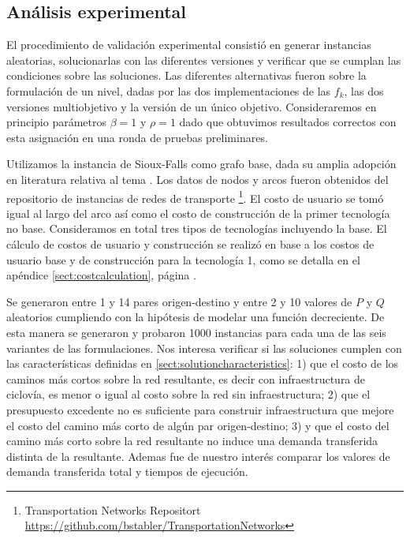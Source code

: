 \documentclass{article}
\begin{document}
  \FloatBarrier
  \subsection{Análisis experimental}

  El procedimiento de validación experimental consistió en generar instancias aleatorias, solucionarlas con las diferentes versiones y verificar que se cumplan las condiciones sobre las soluciones. Las diferentes alternativas fueron sobre la formulación de un nivel, dadas por las dos implementaciones de las $f_k$, las dos versiones multiobjetivo y la versión de un único objetivo. Consideraremos en principio parámetros $\beta = 1$ y $\rho = 1$ dado que obtuvimos resultados correctos con esta asignación en una ronda de pruebas preliminares.

  Utilizamos la instancia de Sioux-Falls como grafo base, dada su amplia adopción en literatura relativa al tema \cite{liu2019}. Los datos de nodos y arcos fueron obtenidos del repositorio de instancias de redes de transporte \footnote{Transportation Networks Repositort \url{https://github.com/bstabler/TransportationNetworks}}. El costo de usuario se tomó igual al largo del arco así como el costo de construcción de la primer tecnología no base. Consideramos en total tres tipos de tecnologías incluyendo la base. El cálculo de costos de usuario y construcción se realizó en base a los costos de usuario base y de construcción para la tecnología 1, como se detalla en el apéndice \ref{sect:costcalculation}, página \pageref{sect:costcalculation}.

  Se generaron entre 1 y 14 pares origen-destino y entre 2 y 10 valores de $P$ y $Q$ aleatorios cumpliendo con la hipótesis de modelar una función decreciente.
  De esta manera se generaron y probaron 1000 instancias para cada una de las seis variantes de las formulaciones. Nos interesa verificar si las soluciones cumplen con las características definidas en \ref{sect:solutioncharacteristics}: 1) que el costo de los caminos más cortos sobre la red resultante, es decir con infraestructura de ciclovía, es menor o igual al costo sobre la red sin infraestructura; 2) que el presupuesto excedente no es suficiente para construir infraestructura que mejore el costo del camino más corto de algún par origen-destino; 3) y que el costo del camino más corto sobre la red resultante no induce una demanda transferida distinta de la resultante. Ademas fue de nuestro interés comparar los valores de demanda transferida total y tiempos de ejecución.
\end{document}
